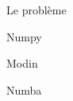 \begin{frame}{Le problème}
\end{frame}

\begin{frame}{Numpy}
  
\end{frame}

\begin{frame}{Modin}
  
\end{frame}

\begin{frame}{Numba}
  
\end{frame}
